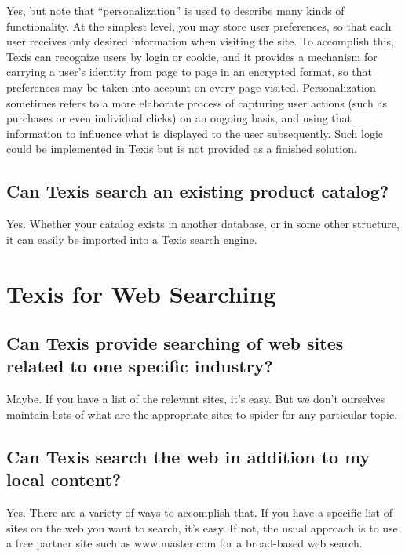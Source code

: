 Yes, but note that ``personalization'' is used to describe many kinds
of functionality. At the simplest level, you may store user
preferences, so that each user receives only desired information when
visiting the site. To accomplish this, Texis can recognize users by
login or cookie, and it provides a mechanism for carrying a user's
identity from page to page in an encrypted format, so that preferences
may be taken into account on every page visited. Personalization
sometimes refers to a more elaborate process of capturing user actions
(such as purchases or even individual clicks) on an ongoing basis, and
using that information to influence what is displayed to the user
subsequently. Such logic could be implemented in Texis but is not
provided as a finished solution.

\section{Can Texis search an existing product catalog? }

Yes. Whether your catalog exists in another database, or in some other
structure, it can easily be imported into a Texis search engine.

\chapter{Texis for Web Searching}

\section{Can Texis provide searching of web sites related to one specific industry? }

Maybe. If you have a list of the relevant sites, it's easy. But we
don't ourselves maintain lists of what are the appropriate sites to
spider for any particular topic.

\section{Can Texis search the web in addition to my local content? }

Yes. There are a variety of ways to accomplish that. If you have a
specific list of sites on the web you want to search, it's easy. If
not, the usual approach is to use a free partner site such as
www.master.com for a broad-based web search.

